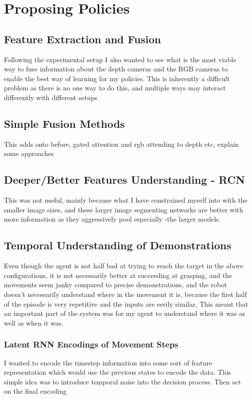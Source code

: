 \section{Proposing Policies}

\subsection{Feature Extraction and Fusion}
Following the experimental setup I also wanted to see what is the most viable way to fuse information about the depth cameras and the RGB cameras to enable the best way of learning for my policies. This is inherently a difficult problem as there is no one way to do this, and multiple ways may interact differently with different setups

\subsection{Simple Fusion Methods}
This adds onto before, gated attention and rgb attending to depth etc, explain some approaches

\subsection{Deeper/Better Features Understanding - RCN}
This was not useful, mainly because what I have constrained myself into with the smaller image sizes, and these larger image segmenting networks are better with more information as they aggressively pool especially -the larger models. 

\subsection{Temporal Understanding of Demonstrations}
Even though the agent is not half bad at trying to reach the target in the above configurations, it is not necessarily better at succeeding at grasping, and the movements seem janky compared to precise demonstrations, and the robot doesn't necessarily understand where in the movement it is, because the first half of the episode is very repetitive and the inputs are eerily similar. This meant that an important part of the system was for my agent to understand where it was as well as when it was.

\subsubsection{Latent RNN Encodings of Movement Steps}
I wanted to encode the timestep information into some sort of feature representation which would use the previous states to encode the data. This simple idea was to introduce temporal noise into the decision process. Then act on the final encoding



